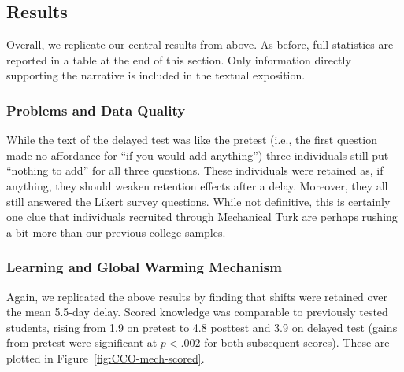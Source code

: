 

\subsection{Results}

Overall, we replicate our central results from above. As before, full statistics
are reported in a table at the end of this section. Only information directly
supporting the narrative is included in the textual exposition.

\subsubsection{Problems and Data Quality}

While the text of the delayed test was like the pretest (i.e., the first
question made no affordance for “if you would add anything”) three individuals
still put “nothing to add” for all three questions. These individuals were
retained as, if anything, they should weaken retention effects after a delay.
Moreover, they all still answered the Likert survey questions. While not
definitive, this is certainly one clue that individuals recruited through Mechanical
Turk are perhaps rushing a bit more than our previous college samples.

\subsubsection{Learning and Global Warming Mechanism}

Again, we replicated the above results by 
finding that shifts were retained over the mean 5.5-day
delay.  Scored knowledge was comparable to previously tested students, rising
from 1.9 on pretest to 4.8 posttest and 3.9 on delayed test (gains from pretest
were significant at $p<.002$ for both subsequent scores). These are plotted in
Figure~\ref{fig:CCO-mech-scored}. 

